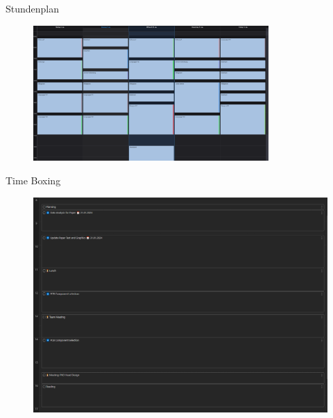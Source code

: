 \begin{frame}{Stundenplan}
    \begin{figure}
       \includegraphics[width=0.8\textwidth]{graphics/Kalender/Kalender5.PNG}
    \end{figure}
\end{frame}

\begin{frame}{Time Boxing}    
    \begin{figure}
       \includegraphics[height=0.8\textheight,trim={0 0 10cm 0},clip]{graphics/MyDailyPlan.png}
    \end{figure}
\end{frame}

